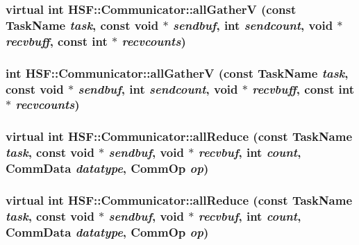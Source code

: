 \label{classHSF_1_1Communicator_a4c1230db745ac434c7ccf883ec385ac0}
\hypertarget{classHSF_1_1Communicator_a4c1230db745ac434c7ccf883ec385ac0}{
\subsubsection[{allGatherV}]{\setlength{\rightskip}{0pt plus 5cm}virtual int HSF::Communicator::allGatherV (const {\bf TaskName} {\em task}, \/  const void $\ast$ {\em sendbuf}, \/  int {\em sendcount}, \/  void $\ast$ {\em recvbuff}, \/  const int $\ast$ {\em recvcounts})}}
\label{classHSF_1_1Communicator_a4c1230db745ac434c7ccf883ec385ac0}
\hypertarget{classHSF_1_1Communicator_a1ab5360c4fe2a01291e223dcd5b48a67}{
\subsubsection[{allGatherV}]{\setlength{\rightskip}{0pt plus 5cm}int HSF::Communicator::allGatherV (const {\bf TaskName} {\em task}, \/  const void $\ast$ {\em sendbuf}, \/  int {\em sendcount}, \/  void $\ast$ {\em recvbuff}, \/  const int $\ast$ {\em recvcounts})}}
\label{classHSF_1_1Communicator_a1ab5360c4fe2a01291e223dcd5b48a67}
\hypertarget{classHSF_1_1Communicator_aa89f31910f7d7f51549ef73acde75236}{
\subsubsection[{allReduce}]{\setlength{\rightskip}{0pt plus 5cm}virtual int HSF::Communicator::allReduce (const {\bf TaskName} {\em task}, \/  const void $\ast$ {\em sendbuf}, \/  void $\ast$ {\em recvbuf}, \/  int {\em count}, \/  CommData {\em datatype}, \/  CommOp {\em op})}}
\label{classHSF_1_1Communicator_aa89f31910f7d7f51549ef73acde75236}
\hypertarget{classHSF_1_1Communicator_aa89f31910f7d7f51549ef73acde75236}{
\subsubsection[{allReduce}]{\setlength{\rightskip}{0pt plus 5cm}virtual int HSF::Communicator::allReduce (const {\bf TaskName} {\em task}, \/  const void $\ast$ {\em sendbuf}, \/  void $\ast$ {\em recvbuf}, \/  int {\em count}, \/  CommData {\em datatype}, \/  CommOp {\em op})}}
